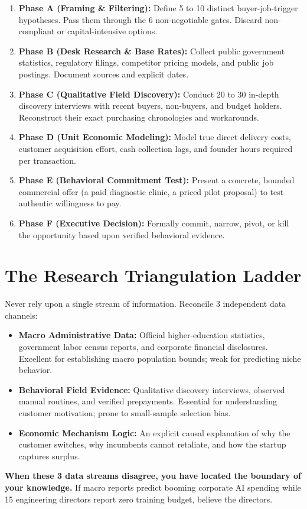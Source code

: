 \begin{enumerate}[leftmargin=14pt,itemsep=3pt,topsep=2pt]
  \item \textbf{Phase A (Framing \& Filtering):} Define 5 to 10 distinct buyer-job-trigger hypotheses. Pass them through the 6 non-negotiable gates. Discard non-compliant or capital-intensive options.
  \item \textbf{Phase B (Desk Research \& Base Rates):} Collect public government statistics, regulatory filings, competitor pricing models, and public job postings. Document sources and explicit dates.
  \item \textbf{Phase C (Qualitative Field Discovery):} Conduct 20 to 30 in-depth discovery interviews with recent buyers, non-buyers, and budget holders. Reconstruct their exact purchasing chronologies and workarounds.
  \item \textbf{Phase D (Unit Economic Modeling):} Model true direct delivery costs, customer acquisition effort, cash collection lags, and founder hours required per transaction.
  \item \textbf{Phase E (Behavioral Commitment Test):} Present a concrete, bounded commercial offer (a paid diagnostic clinic, a priced pilot proposal) to test authentic willingness to pay.
  \item \textbf{Phase F (Executive Decision):} Formally commit, narrow, pivot, or kill the opportunity based upon verified behavioral evidence.
\end{enumerate}

\section{The Research Triangulation Ladder}

Never rely upon a single stream of information. Reconcile 3 independent data channels:
\begin{itemize}[leftmargin=12pt,itemsep=2pt,topsep=1pt]
  \item \textbf{Macro Administrative Data:} Official higher-education statistics, government labor census reports, and corporate financial disclosures. Excellent for establishing macro population bounds; weak for predicting niche behavior.
  \item \textbf{Behavioral Field Evidence:} Qualitative discovery interviews, observed manual routines, and verified prepayments. Essential for understanding customer motivation; prone to small-sample selection bias.
  \item \textbf{Economic Mechanism Logic:} An explicit causal explanation of why the customer switches, why incumbents cannot retaliate, and how the startup captures surplus.
\end{itemize}

\textbf{When these 3 data streams disagree, you have located the boundary of your knowledge.} If macro reports predict booming corporate AI spending while 15 engineering directors report zero training budget, believe the directors.
